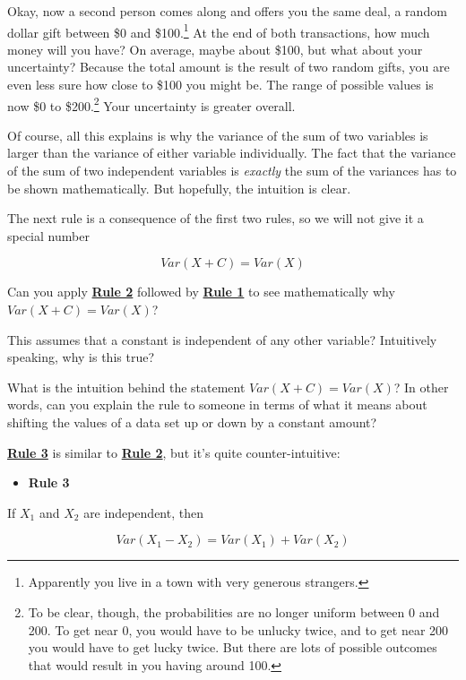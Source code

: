 \documentclass[
]{book}
\providecommand{\tightlist}{%
  \setlength{\itemsep}{0pt}\setlength{\parskip}{0pt}}
\begin{document}
Okay, now a second person comes along and offers you the same deal, a random dollar gift between \$0 and \$100.\footnote{Apparently you live in a town with very generous strangers.} At the end of both transactions, how much money will you have? On average, maybe about \$100, but what about your uncertainty? Because the total amount is the result of two random gifts, you are even less sure how close to \$100 you might be. The range of possible values is now \$0 to \$200.\footnote{To be clear, though, the probabilities are no longer uniform between 0 and 200. To get near 0, you would have to be unlucky twice, and to get near 200 you would have to get lucky twice. But there are lots of possible outcomes that would result in you having around 100.} Your uncertainty is greater overall.

Of course, all this explains is why the variance of the sum of two variables is larger than the variance of either variable individually. The fact that the variance of the sum of two independent variables is \emph{exactly} the sum of the variances has to be shown mathematically. But hopefully, the intuition is clear.

The next rule is a consequence of the first two rules, so we will not give it a special number

\[
Var\left(X + C\right) = Var\left(X\right)
\]

Can you apply \protect\hyperlink{Rule2}{\textbf{Rule 2}} followed by \protect\hyperlink{Rule1}{\textbf{Rule 1}} to see mathematically why \(Var\left(X + C\right) = Var\left(X\right)\)?

This assumes that a constant is independent of any other variable? Intuitively speaking, why is this true?

What is the intuition behind the statement \(Var\left(X + C\right) = Var\left(X\right)\)? In other words, can you explain the rule to someone in terms of what it means about shifting the values of a data set up or down by a constant amount?

\protect\hyperlink{Rule3}{\textbf{Rule 3}} is similar to \protect\hyperlink{Rule2}{\textbf{Rule 2}}, but it's quite counter-intuitive:

\begin{itemize}
\tightlist
\item
  \textbf{Rule 3}
\end{itemize}

If \(X_{1}\) and \(X_{2}\) are independent, then

\[
Var\left(X_{1} - X_{2}\right) =
Var\left(X_{1}\right) + Var\left(X_{2}\right)
\]
\end{document}
